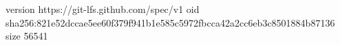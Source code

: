version https://git-lfs.github.com/spec/v1
oid sha256:821e52dccae5ee60f379f941b1e585c5972fbcca42a2cc6eb3c8501884b87136
size 56541
